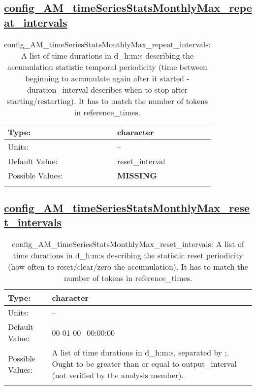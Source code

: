 \subsection[config\_AM\_timeSeriesStatsMonthlyMax\_repeat\_intervals]{\hyperref[sec:nm_tab_AM_timeSeriesStatsMonthlyMax]{config\_AM\_timeSeriesStatsMonthlyMax\_repeat\_intervals}}
\label{subsec:nm_sec_config_AM_timeSeriesStatsMonthlyMax_repeat_intervals}
\begin{center}
\begin{longtable}{| p{2.0in} || p{4.0in} |}
    \hline
    Type: & character \\
    \hline
    Units: & -- \\
    \hline
    Default Value: & reset\_interval \\
    \hline
    Possible Values: & {\bf \color{red} MISSING} \\
    \hline
    \caption{config\_AM\_timeSeriesStatsMonthlyMax\_repeat\_intervals: A list of time durations in d\_h:m:s describing the accumulation statistic temporal periodicity (time between beginning to accumulate again after it started - duration\_interval describes when to stop after starting/restarting). It has to match the number of tokens in reference\_times.}
\end{longtable}
\end{center}
\subsection[config\_AM\_timeSeriesStatsMonthlyMax\_reset\_intervals]{\hyperref[sec:nm_tab_AM_timeSeriesStatsMonthlyMax]{config\_AM\_timeSeriesStatsMonthlyMax\_reset\_intervals}}
\label{subsec:nm_sec_config_AM_timeSeriesStatsMonthlyMax_reset_intervals}
\begin{center}
\begin{longtable}{| p{2.0in} || p{4.0in} |}
    \hline
    Type: & character \\
    \hline
    Units: & -- \\
    \hline
    Default Value: & 00-01-00\_00:00:00 \\
    \hline
    Possible Values: & A list of time durations in d\_h:m:s, separated by ;. Ought to be greater than or equal to output\_interval (not verified by the analysis member). \\
    \hline
    \caption{config\_AM\_timeSeriesStatsMonthlyMax\_reset\_intervals: A list of time durations in d\_h:m:s describing the statistic reset periodicity (how often to reset/clear/zero the accumulation). It has to match the number of tokens in reference\_times.}
\end{longtable}
\end{center}
